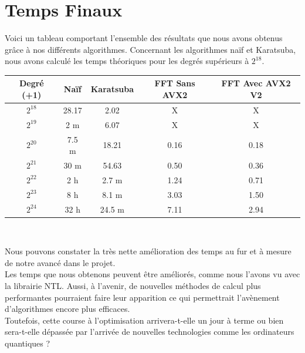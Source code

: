 \documentclass[12pt, a4paper]{article}
\begin{document}
\section{Temps Finaux}

Voici un tableau comportant l'ensemble des résultats que nous avons obtenus grâce à nos différents algorithmes.
Concernant les algorithmes naïf et Karatsuba, nous avons calculé les temps théoriques pour les degrés supérieurs à $2^{18}$. 

\begin{center}
\begin{tabular}{||c c c c c||}
\hline
Degré (+1) & Naïf & Karatsuba & FFT Sans AVX2 & FFT Avec AVX2 V2 \\
\hline\hline
$2^{18}$ & 28.17 & 2.02 & X & X \\
\hline
$2^{19}$ & 2 m & 6.07 & X & X \\
\hline
$2^{20}$ & 7.5 m & 18.21 & 0.16 & 0.18 \\
\hline
$2^{21}$ & 30 m & 54.63 & 0.50 & 0.36 \\
\hline
$2^{22}$ & 2 h & 2.7 m & 1.24 & 0.71 \\
\hline
$2^{23}$ & 8 h & 8.1 m & 3.03 & 1.50 \\
\hline
$2^{24}$ & 32 h & 24.5 m & 7.11 & 2.94 \\
\hline
\end{tabular}
\end{center}
{}
\ \\

\indent Nous pouvons constater la très nette amélioration des temps au fur et à mesure de notre avancé dans le projet. \\
\indent Les temps que nous obtenons peuvent être améliorés, comme nous l'avons vu avec la librairie NTL. Aussi, à l'avenir, de nouvelles méthodes de calcul plus performantes pourraient faire leur apparition ce qui permettrait l'avènement d'algorithmes encore plus efficaces. \\
Toutefois, cette course à l'optimisation arrivera-t-elle un jour à terme ou bien sera-t-elle dépassée par l'arrivée de nouvelles technologies comme les ordinateurs quantiques ?

\newpage



\end{document}
